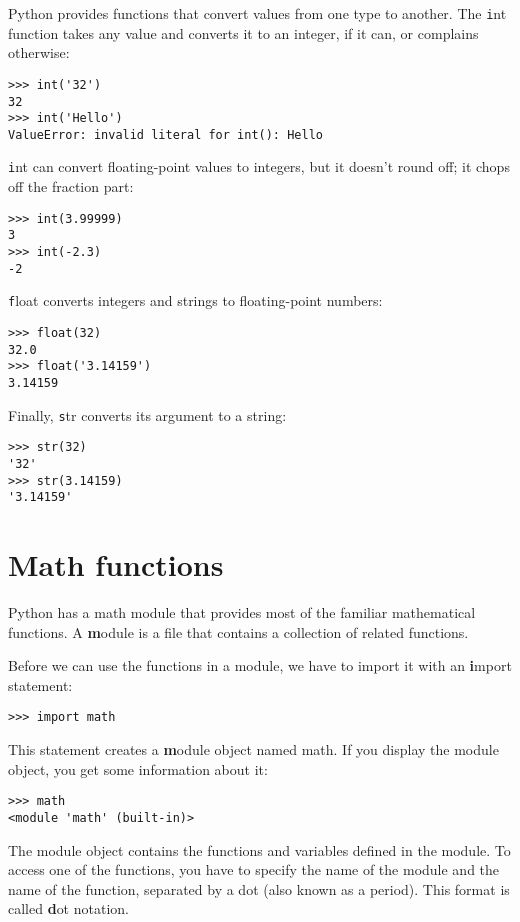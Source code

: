 \documentclass[
DIV=11,
fontsize=13,
twoside,
headinclude=false,
titlepage=firstiscover,
abstract=true,
headsepline=true,
footsepline=true,
chapterprefix=true, %
headings=big,
bibliography=totoc,%
captions=tableheading
]{scrbook}
\theoremstyle{definition}
\begin{document}
Python provides functions that convert values
from one type to another.  The {\texttt int} function takes any value and
converts it to an integer, if it can, or complains otherwise:

\begin{lstlisting}
>>> int('32')
32
>>> int('Hello')
ValueError: invalid literal for int(): Hello
\end{lstlisting}
%
{\texttt int} can convert floating-point values to integers, but it
doesn't round off; it chops off the fraction part:

\begin{lstlisting}
>>> int(3.99999)
3
>>> int(-2.3)
-2
\end{lstlisting}
%
{\texttt float} converts integers and strings to floating-point
numbers:

\begin{lstlisting}
>>> float(32)
32.0
>>> float('3.14159')
3.14159
\end{lstlisting}
%
Finally, {\texttt str} converts its argument to a string:

\begin{lstlisting}
>>> str(32)
'32'
>>> str(3.14159)
'3.14159'
\end{lstlisting}
%

\section{Math functions}

Python has a math module that provides most of the familiar
mathematical functions.  A {\textbf module} is a file that contains a
collection of related functions.

Before we can use the functions in a module, we have to import it with
an {\textbf import statement}:

\begin{lstlisting}
>>> import math
\end{lstlisting}
%
This statement creates a {\textbf module object} named math.  If
you display the module object, you get some information about it:

\begin{lstlisting}
>>> math
<module 'math' (built-in)>
\end{lstlisting}
%
The module object contains the functions and variables defined in the
module.  To access one of the functions, you have to specify the name
of the module and the name of the function, separated by a dot (also
known as a period).  This format is called {\textbf dot notation}.
\end{document}
